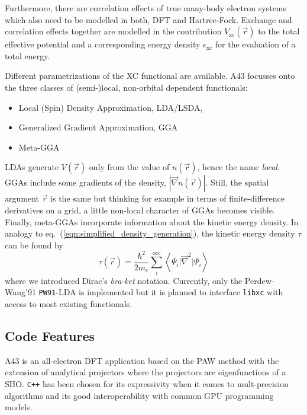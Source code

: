 \documentclass[oribibl]{llncs}
\newcommand{\um}[1]{_{\mathrm{#1}}}
\newcommand{\ttt}[1]{\texttt{#1}}
\newcommand{\braketop}[3]{\left\langle \left. #1 \right| #2 \left| #3 \right. \right\rangle}
\newcommand{\codename}{A43}
\begin{document}
Furthermore, there are correlation effects of true many-body electron systems
which also need to be modelled in both, \ac{DFT} and Hartree-Fock.
Exchange and correlation effects together are modelled in the contribution $V\um{xc}(\vec r)$ 
to the total effective potential and a corresponding energy density $\epsilon\um{xc}$ for the evaluation of a total energy.

Different parametrizations of the \ac{XC} functional are available.
\codename{} focusses onto the three classes of (semi-)local, non-orbital dependent functionals: 
\begin{itemize}
	\item Local (Spin) Density Approximation, LDA/LSDA, 
	\item Generalized Gradient Approximation, GGA
	\item Meta-GGA
\end{itemize}
LDAs generate $V(\vec r)$ only from the value of $n(\vec r)$, 
hence the name \emph{local}. 
GGAs include some gradients of the density, $|\vec \nabla n(\vec r)|$.
Still, the spatial argument $\vec r$ is the same but thinking for example
in terms of finite-difference derivatives on a grid, 
a little non-local character of GGAs becomes visible.
Finally, meta-GGAs incorporate information about the kinetic energy density.
In analogy to eq.~(\ref{eqn:simplified_density_generation}), the kinetic energy density $\tau$ can be found by
\begin{equation}
	\tau(\vec r) = \frac{\hbar^2}{2m_e} \sum_i^{\mathrm{occ}} \braketop{ \Psi_i } {\vec \nabla^2 } { \Psi_i } 
	\label{eqn:simplified_kinetic_energy_density_generation}
\end{equation}
where we introduced Dirac's \emph{bra-ket} notation.
Currently, only the 
Perdew-Wang'91 \ttt{PW91}-LDA is implemented
but it is planned to interface \ttt{libxc} with access to most existing functionals.

\subsection{Code Features} \label{sec:features}
%
\codename{} is an all-electron \ac{DFT} application 
based on the \ac{PAW} method \cite{PhysRevB.50.17953} %
with the extension of analytical projectors \cite{BaumeisterTsukamoto2019}
where the projectors are eigenfunctions of a \ac{SHO}.
\ttt{C++} has been chosen for its expressivity
when it comes to mult-precision algorithms 
and its good interoperability with common \ac{GPU} programming models.
\end{document}
